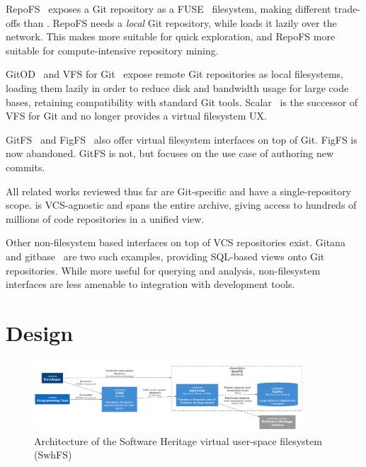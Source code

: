 RepoFS~\cite{spinellis2019repofs} exposes a Git repository as a
FUSE~\cite{fuse, vangoor2017fuseperf} filesystem, making different trade-offs
than \SWHFS{}. RepoFS needs a \emph{local} Git repository, while \SWHFS{} loads
it lazily over the network. This makes \SWHFS{} more suitable for quick
exploration, and RepoFS more suitable for compute-intensive repository mining.

GitOD~\cite{schroeder2012gitod} and VFS for Git~\cite{msvfsforgit} expose
remote Git repositories as local filesystems, loading them lazily in order to
reduce disk and bandwidth usage for large code bases, retaining compatibility
with standard Git tools.
Scalar~\cite{msscalar} is the successor of VFS for Git and no longer provides
a virtual filesystem UX.

GitFS~\cite{presslabs-gitfs} and FigFS~\cite{grant2009figfs} also offer virtual
filesystem interfaces on top of Git. FigFS is now abandoned. GitFS is not, but
focuses on the use case of authoring new commits.

All related works reviewed thus far are Git-specific and have a
single-repository scope. \SWHFS{} is VCS-agnostic and spans the entire \SWH{}
archive, giving access to hundreds of millions of code repositories in a
unified view.

Other non-filesystem based interfaces on top of VCS repositories exist.
Gitana~\cite{cosentino2018gitana} and gitbase~\cite{sourced-gitbase} are two
such examples, providing SQL-based views onto Git repositories. While more
useful for querying and analysis, non-filesystem interfaces are less amenable
to integration with development tools.

\section{Design}

\begin{figure}
  \centering
  \includegraphics[width=0.9\textwidth]{img/fuse/arch-container}
  \caption{Architecture of the Software Heritage virtual user-space filesystem
    (SwhFS)}%
  \label{fig:swhfs-arch}
\end{figure}

